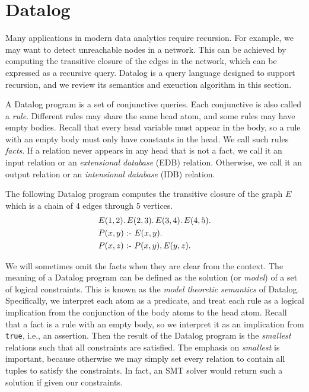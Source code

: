 \section{Datalog}
\label{sec:datalog}

Many applications in modern data analytics require recursion.
For example, we may want to detect unreachable nodes in a network.
This can be achieved by computing the transitive closure 
 of the edges in the network,
 which can be expressed as a recursive query.
Datalog is a query language designed to support recursion, 
 and we review its semantics and exeuction algorithm in this section.

A Datalog program is a set of conjunctive queries.
Each conjunctive is also called a {\em rule}.
Different rules may share the same head atom, 
 and some rules may have empty bodies.
Recall that every head variable must appear in the body,
 so a rule with an empty body must only have constants in the head.
We call such rules {\em facts}.
If a relation never appears in any head that is not a fact,
 we call it an input relation or an {\em extensional database} (EDB) relation.
Otherwise, we call it an output relation or an {\em intensional database} (IDB) relation.

\begin{ex}
\label{ex:datalog}
The following Datalog program computes the transitive closure of the graph $E$ 
 which is a chain of 4 edges through 5 vertices.
\begin{align*}
  &E(1, 2). \, E(2, 3). \, E(3, 4). \, E(4, 5).\\
  &P(x, y) \text{ :- } E(x, y).\\
  &P(x, z) \text{ :- } P(x, y), E(y, z).
\end{align*}
\end{ex}

We will sometimes omit the facts when they are clear from the context.
The meaning of a Datalog program can be defined as the solution (or {\em model}) of 
 a set of logical constraints.
This is known as the {\em model theoretic semantics} of Datalog.
Specifically, we interpret each atom as a predicate,
 and treat each rule as a logical implication
 from the conjunction of the body atoms to the head atom.
Recall that a fact is a rule with an empty body,
 so we interpret it as an implication from \texttt{true}, 
 i.e., an assertion.
Then the result of the Datalog program is the {\em smallest} relations 
 such that all constraints are satisfied.
The emphasis on {\em smallest} is important, 
 because otherwise we may simply set every relation to contain all tuples
 to satisfy the constraints.
In fact, an SMT solver would return such a solution if given our constraints.

